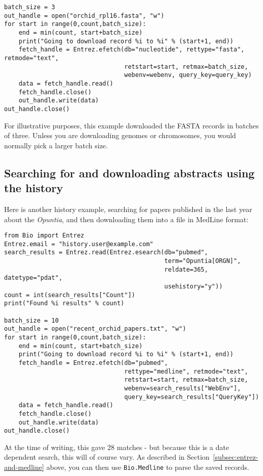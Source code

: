 \documentclass{report}
\begin{document}
\begin{verbatim}
batch_size = 3
out_handle = open("orchid_rpl16.fasta", "w")
for start in range(0,count,batch_size):
    end = min(count, start+batch_size)
    print("Going to download record %i to %i" % (start+1, end))
    fetch_handle = Entrez.efetch(db="nucleotide", rettype="fasta", retmode="text",
                                 retstart=start, retmax=batch_size,
                                 webenv=webenv, query_key=query_key)
    data = fetch_handle.read()
    fetch_handle.close()
    out_handle.write(data)
out_handle.close()
\end{verbatim}

\noindent For illustrative purposes, this example downloaded the FASTA records in batches of three.  Unless you are downloading genomes or chromosomes, you would normally pick a larger batch size.

\subsection{Searching for and downloading abstracts using the history}
Here is another history example, searching for papers published in the last year about the \textit{Opuntia}, and then downloading them into a file in MedLine format:

\begin{verbatim}
from Bio import Entrez
Entrez.email = "history.user@example.com"
search_results = Entrez.read(Entrez.esearch(db="pubmed",
                                            term="Opuntia[ORGN]",
                                            reldate=365, datetype="pdat",
                                            usehistory="y"))
count = int(search_results["Count"])
print("Found %i results" % count)

batch_size = 10
out_handle = open("recent_orchid_papers.txt", "w")
for start in range(0,count,batch_size):
    end = min(count, start+batch_size)
    print("Going to download record %i to %i" % (start+1, end))
    fetch_handle = Entrez.efetch(db="pubmed",
                                 rettype="medline", retmode="text",
                                 retstart=start, retmax=batch_size,
                                 webenv=search_results["WebEnv"],
                                 query_key=search_results["QueryKey"])
    data = fetch_handle.read()
    fetch_handle.close()
    out_handle.write(data)
out_handle.close()
\end{verbatim}

\noindent At the time of writing, this gave 28 matches - but because this is a date dependent search, this will of course vary.  As described in Section~\ref{subsec:entrez-and-medline} above, you can then use \verb|Bio.Medline| to parse the saved records.
\end{document}
